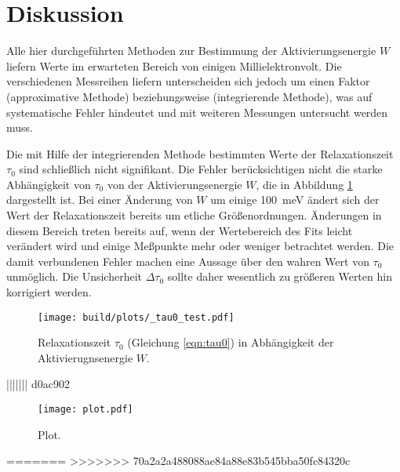 \newpage
\section{Diskussion}
\label{sec:diskussion}
Alle hier durchgeführten Methoden zur Bestimmung der Aktivierungsenergie $W$
liefern Werte im erwarteten Bereich von einigen Millielektronvolt.
Die verschiedenen Messreihen liefern unterscheiden sich jedoch um einen Faktor
 (approximative Methode) beziehungsweise
 (integrierende Methode), was
auf systematische Fehler hindeutet und mit weiteren Messungen untersucht
werden muss.

Die mit Hilfe der integrierenden Methode bestimmten Werte der Relaxationszeit
$\tau_0$ sind schließlich nicht signifikant.
Die Fehler berücksichtigen nicht die starke Abhängigkeit von $\tau_0$ von der
Aktivierungsenergie $W$, die in Abbildung \ref{fig:_tau_test} dargestellt ist.
Bei einer Änderung von $W$ um einige \SI{100}{\milli\electronvolt} ändert
sich der Wert der Relaxationszeit bereits um etliche Größenordnungen.
Änderungen in diesem Bereich treten bereits auf, wenn der Wertebereich des Fits
leicht verändert wird und einige Meßpunkte mehr oder weniger betrachtet werden.
Die damit verbundenen Fehler machen eine Aussage über den wahren Wert von
$\tau_0$ unmöglich.
Die Unsicherheit $\Delta\tau_0$ sollte daher wesentlich zu größeren Werten hin
korrigiert werden.
\begin{figure}
    \centering
    \texttt{[image: build/plots/\_tau0\_test.pdf]}
    \caption{Relaxationszeit $\tau_0$ (Gleichung \ref{eqn:tau0}) in Abhängigkeit der Aktivierugnsenergie $W$.}
    \label{fig:_tau_test}
\end{figure}
||||||| d0ac902
\label{sec:Auswertung}

\begin{figure}
  \centering
  \texttt{[image: plot.pdf]}
  \caption{Plot.}
  \label{fig:plot}
\end{figure}
=======
\label{sec:Auswertung}
>>>>>>> 70a2a2a488088ae84a88e83b545bba50fc84320c
